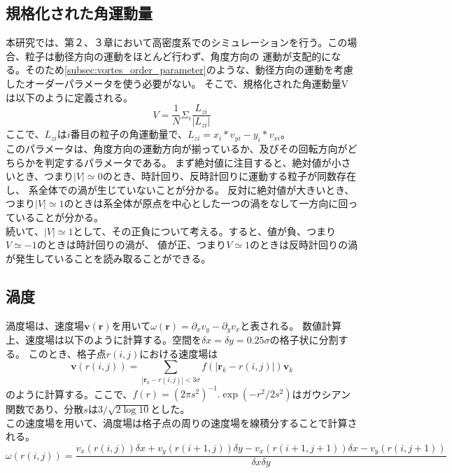 \documentclass[/Users/ikedahajime/GitHub/reserch/master_report/thesis]{subfiles}
\begin{document}
\subsection{規格化された角運動量}
本研究では、第２、３章において高密度系でのシミュレーションを行う。この場合、粒子は動径方向の運動をほとんど行わず、角度方向の
運動が支配的になる。そのため\ref{subsec:vortes_order_parameter}のような、動径方向の運動を考慮したオーダーパラメータを使う必要がない。
そこで、規格化された角運動量V\cite{jiangEmergenceCollectiveDynamical2017}\cite{capriniCollectiveEffectsConfined2021}は以下のように定義される。
\begin{equation}
    V=\frac{1}{N}\Sigma_i \frac{L_{zi}}{ |L_{zi}|}
\end{equation}
ここで、$L_{zi}$は$i$番目の粒子の角運動量で、$L_{zi}=x_i*v_{yi}-y_i*v_{xi}$。\\
このパラメータは、角度方向の運動方向が揃っているか、及びその回転方向がどちらかを判定するパラメータである。
まず絶対値に注目すると、絶対値が小さいとき、つまり$|V|\simeq 0$のとき、時計回り、反時計回りに運動する粒子が同数存在し、
系全体での渦が生じていないことが分かる。
反対に絶対値が大きいとき、つまり$|V|\simeq 1$のときは系全体が原点を中心とした一つの渦をなして一方向に回っていることが分かる。\\
続いて、$|V|\simeq 1$として、その正負について考える。すると、値が負、つまり$V\simeq -1$のときは時計回りの渦が、
値が正、つまり$V\simeq 1$のときは反時計回りの渦が発生していることを読み取ることができる。

\subsection{渦度}\label{subsec:def_vortex}
渦度場は、速度場$\bm{v}(\bm{r})$を用いて$\omega(\bm{r})=\partial_x v_y -\partial_y v_x$と表される。
数値計算上、速度場は以下のように計算する。空間を$\delta x=\delta y=0.25 \sigma$の格子状に分割する。
このとき、格子点$r(i,j)$における速度場は%
\begin{equation}\label{eq:valocity_field}
    \bm{v}(r(i,j))=\sum_{\left|\bm{r}_k-r(i,j)\right|<3\sigma} f(\left|\bm{r}_k-r(i,j)\right|)\bm{v}_k 
\end{equation}
のように計算する。ここで、$f(r)=(2\pi s^2)^{-1}. \exp(-r^2/2s^2)$はガウシアン関数であり、分散$s$は$3/\sqrt{2\log 10}$とした。\\
この速度場を用いて、渦度場は格子点の周りの速度場を線積分することで計算される。
\begin{equation}
    \omega (r(i,j))=\frac{v_x(r(i,j))\delta x +v_y(r(i+1,j)) \delta y -v_x(r(i+1,j+1))\delta x -v_y(r(i,j+1))}{\delta x \delta y}
\end{equation}
\end{document}

